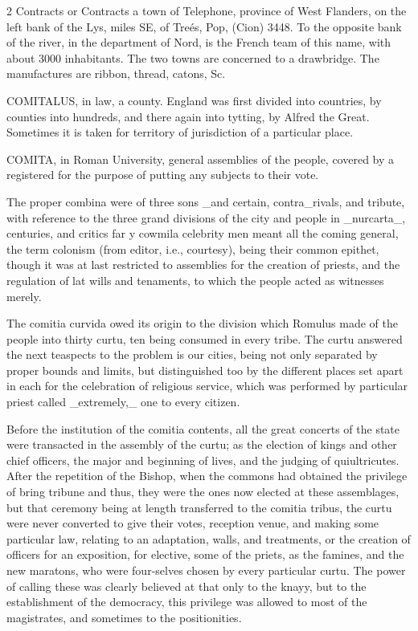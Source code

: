 \documentclass[10pt]{article}
\begin{document}
\begin{multicols}{2}
Contracts or Contracts a town of Telephone, province of West Flanders, on the left bank of the Lys, miles SE, of Treés, Pop, (Cion) 3448. To the opposite bank of the river, in the department of Nord, is the French team of this name, with about 3000 inhabitants. The two towns are concerned to a drawbridge. The manufactures are ribbon, thread, catons, Sc.

COMITALUS, in law, a county. England was first divided into countries, by counties into hundreds, and there again into tytting, by Alfred the Great. Sometimes it is taken for territory of jurisdiction of a particular place.

COMITA, in Roman University, general assemblies of the people, covered by a registered for the purpose of putting any subjects to their vote.

The proper combina were of three sons \_and certain, contra\_rivals, and tribute, with reference to the three grand divisions of the city and people in \_nurcarta\_, centuries, and critics far y cowmila celebrity men meant all the coming general, the term colonism (from editor, i.e., courtesy), being their common epithet, though it was at last restricted to assemblies for the creation of priests, and the regulation of lat wills and tenaments, to which the people acted as witnesses merely.

The comitia curvida owed its origin to the division which Romulus made of the people into thirty curtu, ten being consumed in every tribe. The curtu answered the next teaspects to the problem is our cities, being not only separated by proper bounds and limits, but distinguished too by the different places set apart in each for the celebration of religious service, which was performed by particular priest called \_extremely,\_ one to every citizen.

Before the institution of the comitia contents, all the great concerts of the state were transacted in the assembly of the curtu; as the election of kings and other chief officers, the major and beginning of lives, and the judging of quiultricutes. After the repetition of the Bishop, when the commons had obtained the privilege of bring tribune and thus, they were the ones now elected at these assemblages, but that ceremony being at length transferred to the comitia tribus, the curtu were never converted to give their votes, reception venue, and making some particular law, relating to an adaptation, walls, and treatments, or the creation of officers for an exposition, for elective, some of the priets, as the famines, and the new maratons, who were four-selves chosen by every particular curtu. The power of calling these was clearly believed at that only to the knayy, but to the establishment of the democracy, this privilege was allowed to most of the magistrates, and sometimes to the positionities.


\end{multicols}
\end{document}
